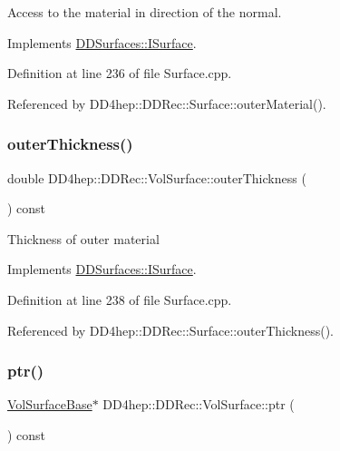 Access to the material in direction of the normal. 



Implements \hyperlink{class_d_d_surfaces_1_1_i_surface_a49dfd8a5eef419226abc675b8d1126a5}{D\+D\+Surfaces\+::\+I\+Surface}.



Definition at line 236 of file Surface.\+cpp.



Referenced by D\+D4hep\+::\+D\+D\+Rec\+::\+Surface\+::outer\+Material().

\hypertarget{class_d_d4hep_1_1_d_d_rec_1_1_vol_surface_ac2113d966dce09b9f714a14a0e0f45c8}{}\label{class_d_d4hep_1_1_d_d_rec_1_1_vol_surface_ac2113d966dce09b9f714a14a0e0f45c8} 
\subsubsection{\texorpdfstring{outer\+Thickness()}{outerThickness()}}
{\footnotesize\ttfamily double D\+D4hep\+::\+D\+D\+Rec\+::\+Vol\+Surface\+::outer\+Thickness (\begin{DoxyParamCaption}{ }\end{DoxyParamCaption}) const\hspace{0.3cm}{\ttfamily [virtual]}}

Thickness of outer material 

Implements \hyperlink{class_d_d_surfaces_1_1_i_surface_aa2559a8904e474835c5d24c243a44909}{D\+D\+Surfaces\+::\+I\+Surface}.



Definition at line 238 of file Surface.\+cpp.



Referenced by D\+D4hep\+::\+D\+D\+Rec\+::\+Surface\+::outer\+Thickness().

\hypertarget{class_d_d4hep_1_1_d_d_rec_1_1_vol_surface_ace0c5e55ea53b4d24aa0a3f63438f1db}{}\label{class_d_d4hep_1_1_d_d_rec_1_1_vol_surface_ace0c5e55ea53b4d24aa0a3f63438f1db} 
\subsubsection{\texorpdfstring{ptr()}{ptr()}}
{\footnotesize\ttfamily \hyperlink{class_d_d4hep_1_1_d_d_rec_1_1_vol_surface_base}{Vol\+Surface\+Base}$\ast$ D\+D4hep\+::\+D\+D\+Rec\+::\+Vol\+Surface\+::ptr (\begin{DoxyParamCaption}{ }\end{DoxyParamCaption}) const\hspace{0.3cm}{\ttfamily [inline]}}



